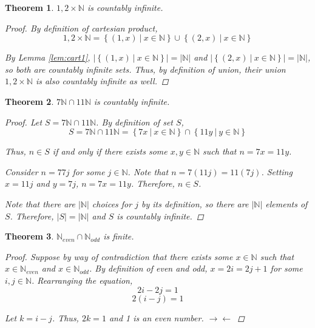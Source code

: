 \documentclass{article}
\newcommand{\divides}{\ |\ }
\newcommand{\contradiction}{$\rightarrow\leftarrow$}
\newtheorem{theorem}{Theorem}
\begin{document}
\begin{outline}[enumerate]
    \1 \begin{theorem}
        ${1, 2} \times \mathbb{N}$ is countably infinite.
    \begin{proof}
        By definition of cartesian product, 
        $${1, 2} \times \mathbb{N} = \left\{(1, x) \divides x \in \mathbb{N}\right\} \cup \left\{(2, x) \divides x \in \mathbb{N}\right\}$$

        By Lemma \ref{lem:cart1}, $|\left\{(1, x) \divides x \in \mathbb{N}\right\}| = |\mathbb{N}|$ and $|\left\{(2, x) \divides x \in \mathbb{N}\right\}| = |\mathbb{N}|$, so both are countably infinite sets. Thus, by definition of union, their union ${1, 2} \times \mathbb{N}$ is also countably infinite as well.
    \end{proof}
    \end{theorem}

    \1 
        \2 \begin{theorem}
            $7\mathbb{N} \cap 11\mathbb{N}$ is countably infinite.
            \begin{proof}
                Let $S = 7\mathbb{N} \cap 11\mathbb{N}$. By definition of set $S$,
                $$S = 7\mathbb{N} \cap 11\mathbb{N} = \left\{7x \divides x \in \mathbb{N}\right\} \cap \left\{11y \divides y \in \mathbb{N}\right\}$$

                Thus, $n \in S$ if and only if there exists some $x, y \in \mathbb{N}$ such that $n = 7x = 11y$.

                Consider $n = 77j$ for some $j \in \mathbb{N}$. Note that $n = 7(11j) = 11(7j)$. Setting $x = 11j$ and $y = 7j$, $n = 7x = 11y$. Therefore, $n \in S$.

                Note that there are $|\mathbb{N}|$ choices for $j$ by its definition, so there are $|\mathbb{N}|$ elements of $S$. Therefore, $|S| = |\mathbb{N}|$ and $S$ is countably infinite.
            \end{proof}
        \end{theorem}
        \2 \begin{theorem}
        $\mathbb{N}_{even} \cap \mathbb{N}_{odd}$ is finite.
        \begin{proof}
            Suppose by way of contradiction that there exists some $x \in \mathbb{N}$ such that $x \in \mathbb{N}_{even}$ and $x \in \mathbb{N}_{odd}$. By definition of even and odd, $x = 2i = 2j + 1$ for some $i, j \in \mathbb{N}$. Rearranging the equation,
            $$2i - 2j = 1$$
            $$2(i - j) = 1$$

            Let $k = i - j$. Thus, $2k = 1$ and 1 is an even number. \contradiction


\end{proof}
\end{theorem}
\end{outline}
\end{document}
